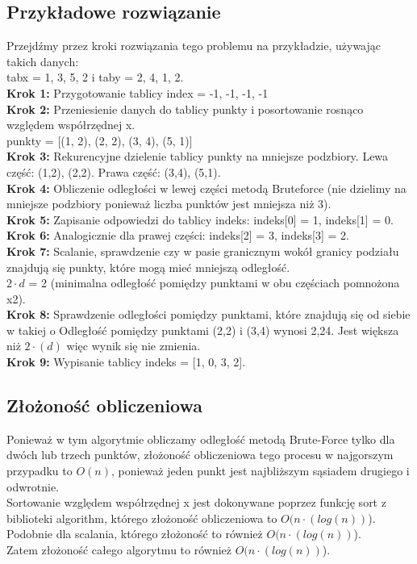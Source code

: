 \documentclass[12pt,twoside]{article}
\begin{document}
\clearpage
\subsection{Przykładowe rozwiązanie}
Przejdźmy przez kroki rozwiązania tego problemu na przykładzie, używając takich danych: \\
tabx = {1, 3, 5, 2} i taby = {2, 4, 1, 2}.\\
\textbf{Krok 1:} Przygotowanie tablicy index = {-1, -1, -1, -1}\\
\textbf{Krok 2:} Przeniesienie danych do tablicy punkty i posortowanie rosnąco względem współrzędnej x.\\
punkty = [(1, 2), (2, 2), (3, 4), (5, 1)]\\
\textbf{Krok 3:} Rekurencyjne dzielenie tablicy punkty na mniejsze podzbiory. Lewa część: (1,2), (2,2). Prawa część: (3,4), (5,1).\\
\textbf{Krok 4:} Obliczenie odległości w lewej części metodą Bruteforce (nie dzielimy na mniejsze podzbiory ponieważ liczba punktów jest mniejsza niż 3).\\
\textbf{Krok 5:} Zapisanie odpowiedzi do tablicy indeks: indeks[0] = 1, indeks[1] = 0.\\
\textbf{Krok 6:} Analogicznie dla prawej części: indeks[2] = 3, indeks[3] = 2.\\
\textbf{Krok 7:} Scalanie, sprawdzenie czy w pasie granicznym wokół granicy podziału znajdują się punkty, które mogą mieć mniejszą odległość.\\
\(2\cdot{d}\) = 2 (minimalna odległość pomiędzy punktami w obu częściach pomnożona x2). \\
\textbf{Krok 8:} Sprawdzenie odległości pomiędzy punktami, które znajdują się od siebie w takiej o
Odległość pomiędzy punktami (2,2) i (3,4) wynosi 2,24. Jest większa niż \(2\cdot(d)\) więc wynik się nie zmienia.\\
\textbf{Krok 9:} Wypisanie tablicy indeks = [1, 0, 3, 2].


\subsection{Złożoność obliczeniowa}
Ponieważ w tym algorytmie obliczamy odległość metodą Brute-Force tylko dla dwóch lub trzech punktów, złożoność obliczeniowa tego procesu w najgorszym przypadku to \(O(n)\), ponieważ jeden punkt jest najbliższym sąsiadem drugiego i odwrotnie. \\
Sortowanie względem współrzędnej x jest dokonywane poprzez funkcję sort z biblioteki algorithm, którego złożoność obliczeniowa to \(O(n\cdot(log(n))\)). Podobnie dla scalania, którego złożoność to również \(O(n\cdot(log(n))\)). \\
Zatem złożoność całego algorytmu to również \(O(n\cdot(log(n))\)).
\end{document}
